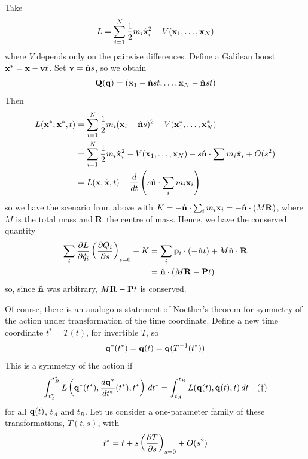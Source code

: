 \documentclass{../template/note}
\begin{document}
    \begin{example*}
        Take
        \begin{align*}
            L = \sum_{i=1}^N \frac 1 2 m_i \dot{\V x}_i^2 - V(\V x_1, \dots, \V x_N)
        \end{align*}
        where $V$ depends only on the pairwise differences. Define a Galilean boost $\V x^* = \V x - \V v t$. Set $\V v = \hvec n s$, so we obtain
        \begin{align*}
            \V Q(\V q) = (\V x_1 - \hvec n st, \dots, \V x_N - \hvec n st)
        \end{align*}
        Then
        \begin{align*}
            L(\V x^*, \dot{\V x}^*, t) &= \sum_{i=1}^N \frac 1 2 m_i (\V x_i - \hvec n s)^2 - V(\V x_1^*, \dots, \V x_N^*) \\
            &= \sum_{i=1}^N \frac 1 2 m_i \dot{\V x}_i^2 - V(\V x_1, \dots, \V x_N) - s\hvec n \cdot \sum m_i \dot{\V x}_i + O(s^2) \\
            &= L(\V x, \dot{\V x}, t) - \frac{d}{dt}\left(s\hvec n \cdot \sum_i m_i \V x_i\right)
        \end{align*}
        so we have the scenario from above with $K = -\hvec n \cdot \sum_i m_i \V x_i = -\hvec n \cdot (M\V R)$, where $M$ is the total mass and $\V R$ the centre of mass. Hence, we have the conserved quantity
        \begin{align*}
            \sum_i \pd{L}{\dot q_i} \left(\pd{Q_i}{s}\right)_{s=0} - K &= \sum_i \V p_i \cdot (-\hvec n t) + M \hvec n \cdot \V R \\
            &= \hvec n \cdot (M \V R - \V P t)
        \end{align*}
        so, since $\hvec n$ was arbitrary, $M \V R - \V P t$ is conserved.
    \end{example*}
    
    Of course, there is an analogous statement of Noether's theorem for symmetry of the action under transformation of the time coordinate. Define a new time coordinate $t^* = T(t)$, for invertible $T$, so
    \begin{align*}
        \V q^*(t^*) = \V q(t) = \V q(T^{-1}(t^*))
    \end{align*}
    This is a symmetry of the action if
    \begin{align*}
        \int_{t_A^*}^{t_B^*} L\left(\V q^*(t^*), \frac{d \V q^*}{dt^*}(t^*), t^*\right) \D t^* = \int_{t_A}^{t_B} L(\V q(t), \dot{\V q}(t), t) \D t && (\dagger)
    \end{align*}
    for all $\V q(t)$, $t_A$ and $t_B$. Let us consider a one-parameter family of these transformations, $T(t, s)$, with
    \begin{align*}
        t^* = t + s \left(\pd{T}{s}\right)_{s=0} + O(s^2)
    \end{align*}
    
\end{document}
